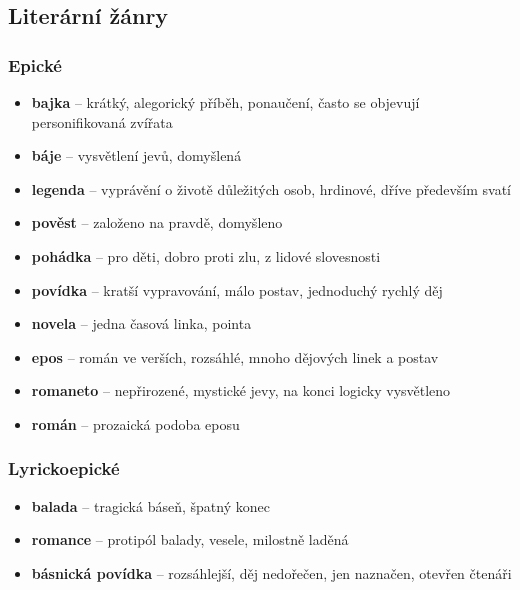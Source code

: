 \documentclass[10pt,a4paper]{article}
\begin{document}
\subsection{Literární žánry}
\subsubsection{Epické}
\begin{itemize}
\item[] \textbf{bajka} -- krátký, alegorický příběh, ponaučení, často se objevují personifikovaná zvířata
\item[] \textbf{báje} -- vysvětlení jevů, domyšlená
\item[] \textbf{legenda} -- vyprávění o životě důležitých osob, hrdinové, dříve především svatí
\item[] \textbf{pověst} -- založeno na pravdě, domyšleno
\item[] \textbf{pohádka} -- pro děti, dobro proti zlu, z lidové slovesnosti
\item[] \textbf{povídka} -- kratší vypravování, málo postav, jednoduchý rychlý děj
\item[] \textbf{novela} -- jedna časová linka, pointa
\item[] \textbf{epos} -- román ve verších, rozsáhlé, mnoho dějových linek a postav
\item[] \textbf{romaneto} -- nepřirozené, mystické jevy, na konci logicky vysvětleno
\item[] \textbf{román} -- prozaická podoba eposu
\end{itemize}

\subsubsection{Lyrickoepické}
\begin{itemize}
\item[] \textbf{balada} -- tragická báseň, špatný konec
\item[] \textbf{romance} -- protipól balady, vesele, milostně laděná
\item[] \textbf{básnická povídka} -- rozsáhlejší, děj nedořečen, jen naznačen, otevřen čtenáři
\end{itemize}
\end{document}
